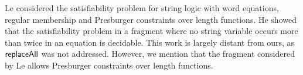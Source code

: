 

%


 Le \cite{L16} considered the satisfiability problem for string logic with word equations, regular membership and Presburger constraints over length functions. %
He showed that the satisfiability problem in a fragment where no string variable occurs more than twice in an equation is decidable. 
This work is largely distant from ours, as $\mathsf{replaceAll}$ was not addressed. However, we mention that the fragment considered by Le allows Presburger constraints over length functions.

